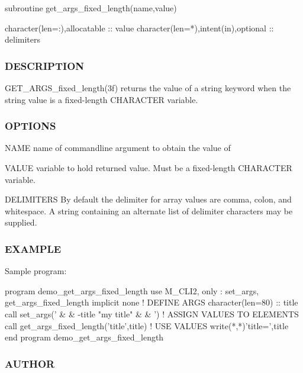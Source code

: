 \begin{DoxyVerb}subroutine get_args_fixed_length(name,value)

 character(len=:),allocatable :: value
 character(len=*),intent(in),optional :: delimiters
\end{DoxyVerb}


\subsubsection*{D\+E\+S\+C\+R\+I\+P\+T\+I\+ON}

\begin{DoxyVerb}GET_ARGS_fixed_length(3f) returns the value of a string
keyword when the string value is a fixed-length CHARACTER
variable.
\end{DoxyVerb}


\subsubsection*{O\+P\+T\+I\+O\+NS}

\begin{DoxyVerb}NAME   name of commandline argument to obtain the value of

VALUE  variable to hold returned value.
       Must be a fixed-length CHARACTER variable.

DELIMITERS  By default the delimiter for array values are comma,
            colon, and whitespace. A string containing an alternate
            list of delimiter characters may be supplied.
\end{DoxyVerb}


\subsubsection*{E\+X\+A\+M\+P\+LE}

Sample program\+: \begin{DoxyVerb}program demo_get_args_fixed_length
use M_CLI2,  only : set_args, get_args_fixed_length
implicit none
! DEFINE ARGS
character(len=80)   :: title
call set_args(' &
   & -title "my title" &
   & ')
! ASSIGN VALUES TO ELEMENTS
   call get_args_fixed_length('title',title)
! USE VALUES
   write(*,*)'title=',title
end program demo_get_args_fixed_length
\end{DoxyVerb}


\subsubsection*{A\+U\+T\+H\+OR}

